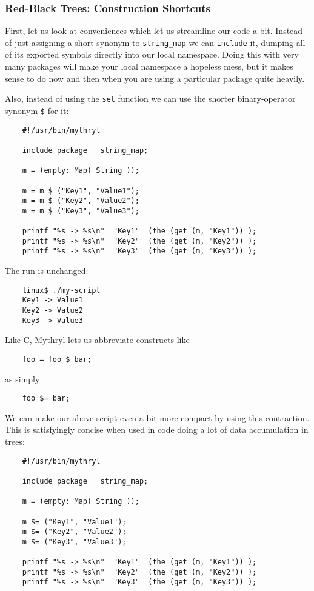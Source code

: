\cutend*

\subsubsection{Red-Black Trees: Construction Shortcuts}

First, let us look at conveniences which let us streamline our 
code a bit.  Instead of just assigning a short synonym to 
{\tt string\_map} we can {\tt include} it, dumping all of its 
exported symbols directly into our local namespace.  Doing 
this with very many packages will make your local namespace 
a hopeless mess, but it makes sense to do now and then when 
you are using a particular package quite heavily.

Also, 
instead of using the {\tt set} function we can use the 
shorter binary-operator synonym {\tt \$} for it:

\begin{verbatim}
    #!/usr/bin/mythryl

    include package   string_map;

    m = (empty: Map( String ));

    m = m $ ("Key1", "Value1");
    m = m $ ("Key2", "Value2");
    m = m $ ("Key3", "Value3");

    printf "%s -> %s\n"  "Key1"  (the (get (m, "Key1")) );
    printf "%s -> %s\n"  "Key2"  (the (get (m, "Key2")) );
    printf "%s -> %s\n"  "Key3"  (the (get (m, "Key3")) );
\end{verbatim}
 
The run is unchanged:

\begin{verbatim}
    linux$ ./my-script
    Key1 -> Value1
    Key2 -> Value2
    Key3 -> Value3
\end{verbatim}

Like C, Mythryl lets us abbreviate constructs like
\begin{verbatim}
    foo = foo $ bar;
\end{verbatim}
as simply
\begin{verbatim}
    foo $= bar;
\end{verbatim}

We can make our above script even a bit more compact by using 
this contraction.  This is satisfyingly 
concise when used in code doing a lot of data accumulation 
in trees:

\begin{verbatim}
    #!/usr/bin/mythryl

    include package   string_map;

    m = (empty: Map( String ));

    m $= ("Key1", "Value1");
    m $= ("Key2", "Value2");
    m $= ("Key3", "Value3");

    printf "%s -> %s\n"  "Key1"  (the (get (m, "Key1")) );
    printf "%s -> %s\n"  "Key2"  (the (get (m, "Key2")) );
    printf "%s -> %s\n"  "Key3"  (the (get (m, "Key3")) );
\end{verbatim}

